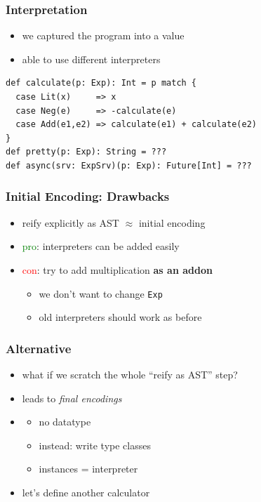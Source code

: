 \documentclass{beamer}
\begin{document}
\begin{frame}[fragile]
  \frametitle{Interpretation}
  \begin{itemize}
  \item we captured the program into a value
  \item able to use different interpreters
  \end{itemize}
\begin{verbatim}
def calculate(p: Exp): Int = p match {
  case Lit(x)     => x
  case Neg(e)     => -calculate(e)
  case Add(e1,e2) => calculate(e1) + calculate(e2)
}
def pretty(p: Exp): String = ???
def async(srv: ExpSrv)(p: Exp): Future[Int] = ???
\end{verbatim}
\end{frame}

\begin{frame}
  \frametitle{Initial Encoding: Drawbacks}
  \begin{itemize}
  \item reify explicitly as AST $\approx{}$ initial encoding
  \item \textcolor{green}{pro}: interpreters can be added easily
  \item \textcolor{red}{con}: try to add multiplication \textbf{as an addon}
    \begin{itemize}
    \item we don't want to change \texttt{Exp}
    \item old interpreters should work as before
    \end{itemize}
  \end{itemize}
\end{frame}

\begin{frame}
  \frametitle{Alternative}
  \begin{itemize}
  \item what if we scratch the whole ``reify as AST'' step?
  \item leads to \textit{final encodings}
  \item \begin{itemize}
    \item no datatype
    \item instead: write type classes
    \item instances = interpreter
    \end{itemize}
  \item let's define another calculator
  \end{itemize}
\end{frame}
\end{document}
